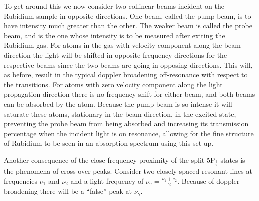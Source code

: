 \documentclass[paper=a4, fontsize=11pt]{scrartcl} %
\numberwithin{equation}{section}
\numberwithin{figure}{section}
\numberwithin{table}{section}
\begin{document}
To get around this we now consider two collinear beams incident on the
Rubidium sample in opposite directions. One beam, called the pump
beam, is to have intensity much greater than the other. The weaker
beam is called the probe beam, and is the one whose intensity is to be
measured after exiting the Rubidium gas. For atoms in the gas with velocity
component along the beam direction the light will be shifted in
opposite frequency directions for the respective beams since the two beams are
going in opposing directions. This will, as before, result in the
typical doppler broadening off-resonance with respect to the
transitions. For atoms with zero velocity component along the light
propagation direction there is no frequency shift for either beam, and
both beams can be absorbed by the atom. Because the pump beam is so
intense it will saturate these atoms, stationary in the beam
direction, in the excited state, preventing the probe beam from being
absorbed and increasing its transmission percentage when the incident
light is on resonance, allowing for the fine structure of Rubidium to
be seen in an absorption spectrum using this set up.

Another consequence of the close frequency proximity of the split
5P$_{\frac{3}{2}}$ states is the phenomena of cross-over
peaks. Consider two closely spaced resonant lines at frequencies
$\nu_1$ and $\nu_2$ and a light frequency of $\nu_{\gamma} = \frac{\nu_1 +
  \nu_2}{2}$. Because of doppler broadening there will be a ``false''
peak at $\nu_{\gamma}$. 
\end{document}
